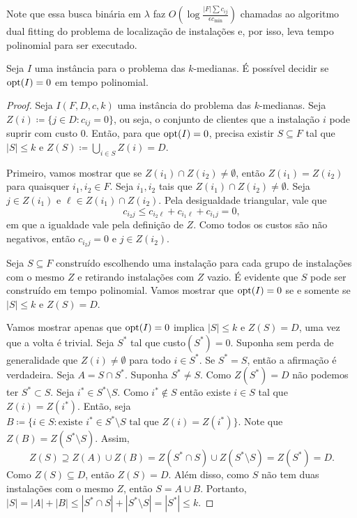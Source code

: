 Note que essa busca binária em $\lambda$ faz $O(\log \frac{|F| \sum c_{ij}}{\epsilon c_{\min}})$ chamadas ao algoritmo dual fitting do problema de localização de instalações e, por isso, leva tempo polinomial para ser executado.

\begin{lemma}
    Seja $I$ uma instância para o problema das $k$-medianas. É possível decidir se $\mathrm{opt}(I) = 0$ em tempo polinomial.
\end{lemma}
\begin{proof}
    Seja $I(F,D,c,k)$ uma instância do problema das $k$-medianas. Seja $Z(i) \coloneqq \{j \in D: c_{ij} = 0\}$, ou seja, o conjunto de clientes que a instalação $i$ pode suprir com custo 0. Então, para que $\mathrm{opt}(I) = 0$, precisa existir $S \subseteq F$ tal que $|S|\leq k$ e $Z(S) \coloneqq \bigcup_{i \in S} Z(i) = D$.

    Primeiro, vamos mostrar que se $Z(i_1) \cap Z(i_2) \neq \emptyset$, então $Z(i_1) = Z(i_2)$ para quaisquer $i_1,i_2 \in F$. Seja $i_1,i_2$ tais que $Z(i_1) \cap Z(i_2) \neq \emptyset$. Seja $j \in Z(i_1)$ e $\ell \in Z(i_1) \cap Z(i_2)$. Pela desigualdade triangular, vale que
    \[c_{i_2j} \leq c_{i_2\ell} + c_{i_1\ell} + c_{i_1j} = 0,\]
    em que a igualdade vale pela definição de $Z$. Como todos os custos são não negativos, então $c_{i_2j} = 0$ e $j \in Z(i_2)$.

    Seja $S \subseteq F$ construído escolhendo uma instalação para cada grupo de instalações com o mesmo $Z$ e retirando instalações com $Z$ vazio. É evidente que $S$ pode ser construído em tempo polinomial. Vamos mostrar que $\mathrm{opt}(I) = 0$ se e somente se $|S| \leq k$ e $Z(S) = D$.

    Vamos mostrar apenas que $\mathrm{opt}(I) = 0$ implica $|S|\leq k$ e $Z(S) = D$, uma vez que a volta é trivial. Seja $S^*$ tal que custo$(S^*) = 0$. Suponha sem perda de generalidade que $Z(i) \neq \emptyset$ para todo $i \in S^*$. Se $S^* = S$, então a afirmação é verdadeira. Seja $A = S \cap S^*$. Suponha $S^* \neq S$. Como $Z(S^*)=D$ não podemos ter $S^* \subset S$. Seja $i^* \in S^* \setminus S$. Como $i^* \not \in S$ então existe $i \in S$ tal que $Z(i) = Z(i^*)$. Então, seja $B \coloneqq \{i \in S: \text{existe } i^* \in S^* \setminus S \text{ tal que } Z(i) = Z(i^*)\}$. Note que $Z(B) = Z(S^*\setminus S)$. Assim,
    \[Z(S) \supseteq Z(A) \cup Z(B) = Z(S^* \cap S) \cup Z(S^*\setminus S) = Z(S^*) = D.\]
    Como $Z(S) \subseteq D$, então $Z(S) = D$. Além disso, como $S$ não tem duas instalações com o mesmo $Z$, então $S = A \cup B$. Portanto, $|S| = |A| + |B| \leq |S^* \cap S| + |S^* \setminus S| = |S^*| \leq k$.
\end{proof}

